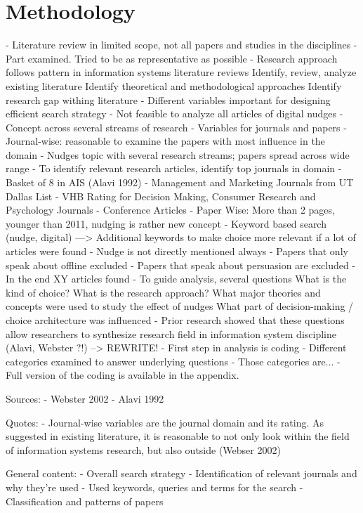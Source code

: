 \section{Methodology}



- Literature review in limited scope, not all papers and studies in the disciplines
- Part examined. Tried to be as representative as possible
- Research approach follows pattern in information systems literature reviews
	Identify, review, analyze existing literature
	Identify theoretical and methodological approaches
	Identify research gap withing literature
- Different variables important for designing efficient search strategy
- Not feasible to analyze all articles of digital nudges
- Concept across several streams of research
- Variables for journals and papers
- Journal-wise: reasonable to examine the papers with most influence in the domain
- Nudges topic with several research streams; papers spread across wide range
- To identify relevant research articles, identify top journals in domain
- Basket of 8 in AIS (Alavi 1992)
- Management and Marketing Journals from UT Dallas List
- VHB Rating for Decision Making, Consumer Research and Psychology Journals
- Conference Articles
- Paper Wise: More than 2 pages, younger than 2011, nudging is rather new concept
- Keyword based search (nudge, digital) ---> Additional keywords to make choice more relevant if a lot of articles were found
- Nudge is not directly mentioned always
- Papers that only speak about offline excluded
- Papers that speak about persuasion are excluded
- In the end XY articles found
- To guide analysis, several questions
	What is the kind of choice?
	What is the research approach?
	What major theories and concepts were used to study the effect of nudges
	What part of decision-making / choice architecture was influenced
- Prior research showed that these questions allow researchers to synthesize research field in information system discipline (Alavi, Webster ?!) --> REWRITE!
- First step in analysis is coding
- Different categories examined to answer underlying questions
- Those categories are...
- Full version of the coding is available in the appendix.

Sources:
- Webster 2002
- Alavi 1992

Quotes:
- Journal-wise variables are the journal domain and its rating. As suggested in existing literature, it is reasonable to not only look within the field of information systems research, but also outside (Webser 2002)

General content: 
-	Overall search strategy
-	Identification of relevant journals and why they’re used
-	Used keywords, queries and terms for the search
-	Classification and patterns of papers